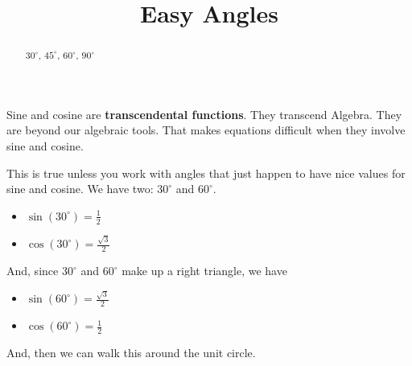 \documentclass{ximera}
\title{Easy Angles}
\begin{document}
\begin{abstract}
$30^{\circ}$, $45^{\circ}$, $60^{\circ}$, $90^{\circ}$
\end{abstract}
\maketitle


Sine and cosine are \textbf{transcendental functions}.  They transcend Algebra. They are beyond our algebraic tools.  That makes equations difficult when they involve sine and cosine.


This is true unless you work with angles that just happen to have nice values for sine and cosine.  We have two: $30^{\circ}$ and $60^{\circ}$.




\begin{itemize}
\item $\sin(30^{\circ}) = \frac{1}{2}$
\item $\cos(30^{\circ}) = \frac{\sqrt{3}}{2}$
\end{itemize}


And, since $30^{\circ}$ and $60^{\circ}$ make up a right triangle, we have 


\begin{itemize}
\item $\sin(60^{\circ}) = \frac{\sqrt{3}}{2}$
\item $\cos(60^{\circ}) = \frac{1}{2}$
\end{itemize}



And, then we can walk this around the unit circle.
\end{document}
